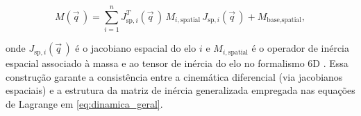 \begin{equation}
M(\vec q\,) =
\sum_{i=1}^{n}
J_{\text{sp},i}^{T}(\vec q\,)\,
M_{i,\text{spatial}}\,
J_{\text{sp},i}(\vec q\,)
+
M_{\text{base},\text{spatial}},
\end{equation}

onde $J_{\text{sp},i}(\vec q\,)$ é o jacobiano espacial do elo $i$ e
$M_{i,\text{spatial}}$ é o operador de inércia espacial associado à
massa e ao tensor de inércia do elo no formalismo 6D
\cite{featherstone2008}. Essa construção garante a consistência entre a
cinemática diferencial (via jacobianos espaciais) e a estrutura da
matriz de inércia generalizada empregada nas equações de Lagrange em
\eqref{eq:dinamica_geral}.
